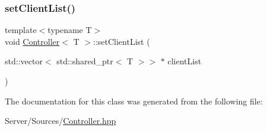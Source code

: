 \mbox{\label{classController_ab0a4b7ba96fd7f9ba0865de7b85c8e9a}} 
\subsubsection{\texorpdfstring{set\+Client\+List()}{setClientList()}}
{\footnotesize\ttfamily template$<$typename T$>$ \\
void \hyperlink{classController}{Controller}$<$ T $>$\+::set\+Client\+List (\begin{DoxyParamCaption}\item[{std\+::vector$<$ std\+::shared\+\_\+ptr$<$ T $>$$>$ $\ast$}]{client\+List }\end{DoxyParamCaption})\hspace{0.3cm}{\ttfamily [inline]}}



The documentation for this class was generated from the following file\+:\begin{DoxyCompactItemize}
\item 
Server/\+Sources/\hyperlink{Controller_8hpp}{Controller.\+hpp}\end{DoxyCompactItemize}
